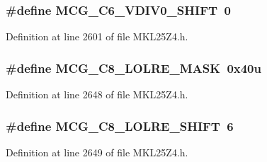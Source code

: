 \subsubsection[{\texorpdfstring{M\+C\+G\+\_\+\+C6\+\_\+\+V\+D\+I\+V0\+\_\+\+S\+H\+I\+FT}{MCG_C6_VDIV0_SHIFT}}]{\setlength{\rightskip}{0pt plus 5cm}\#define M\+C\+G\+\_\+\+C6\+\_\+\+V\+D\+I\+V0\+\_\+\+S\+H\+I\+FT~0}\hypertarget{group___m_c_g___register___masks_ga92208f56fc7ce68a0a8ff14ab5c3b2f6}{}\label{group___m_c_g___register___masks_ga92208f56fc7ce68a0a8ff14ab5c3b2f6}


Definition at line 2601 of file M\+K\+L25\+Z4.\+h.

\subsubsection[{\texorpdfstring{M\+C\+G\+\_\+\+C8\+\_\+\+L\+O\+L\+R\+E\+\_\+\+M\+A\+SK}{MCG_C8_LOLRE_MASK}}]{\setlength{\rightskip}{0pt plus 5cm}\#define M\+C\+G\+\_\+\+C8\+\_\+\+L\+O\+L\+R\+E\+\_\+\+M\+A\+SK~0x40u}\hypertarget{group___m_c_g___register___masks_gaeab391a933aec2eeb1ffdbc772f714e2}{}\label{group___m_c_g___register___masks_gaeab391a933aec2eeb1ffdbc772f714e2}


Definition at line 2648 of file M\+K\+L25\+Z4.\+h.

\subsubsection[{\texorpdfstring{M\+C\+G\+\_\+\+C8\+\_\+\+L\+O\+L\+R\+E\+\_\+\+S\+H\+I\+FT}{MCG_C8_LOLRE_SHIFT}}]{\setlength{\rightskip}{0pt plus 5cm}\#define M\+C\+G\+\_\+\+C8\+\_\+\+L\+O\+L\+R\+E\+\_\+\+S\+H\+I\+FT~6}\hypertarget{group___m_c_g___register___masks_ga247e347342c951c4b8044bece01311fb}{}\label{group___m_c_g___register___masks_ga247e347342c951c4b8044bece01311fb}


Definition at line 2649 of file M\+K\+L25\+Z4.\+h.

